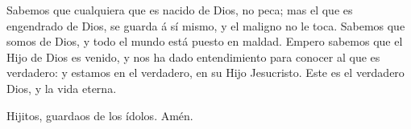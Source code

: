  Sabemos que cualquiera que es nacido de Dios, no peca;
mas el que es engendrado de Dios, se guarda á sí mismo, y el maligno no
le toca.  Sabemos que somos de Dios, y todo el mundo está
puesto en maldad.  Empero sabemos que el Hijo de Dios es
venido, y nos ha dado entendimiento para conocer al que es verdadero: y
estamos en el verdadero, en su Hijo Jesucristo. Este es el verdadero
Dios, y la vida eterna.

 Hijitos, guardaos de los ídolos. Amén.
